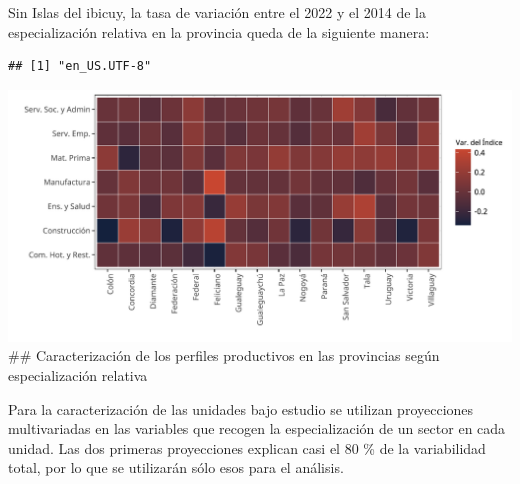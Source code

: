 \documentclass[
]{article}
\begin{document}
Sin Islas del ibicuy, la tasa de variación entre el 2022 y el 2014 de la
especialización relativa en la provincia queda de la siguiente manera:

\begin{verbatim}
## [1] "en_US.UTF-8"
\end{verbatim}

\includegraphics{documento-final_files/figure-latex/unnamed-chunk-3-1.pdf}
\#\# Caracterización de los perfiles productivos en las provincias según
especialización relativa

Para la caracterización de las unidades bajo estudio se utilizan
proyecciones multivariadas en las variables que recogen la
especialización de un sector en cada unidad. Las dos primeras
proyecciones explican casi el 80 \% de la variabilidad total, por lo que
se utilizarán sólo esos para el análisis.
\end{document}

